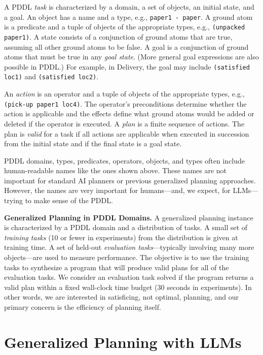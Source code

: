 \documentclass[letterpaper]{article} %
\begin{document}
A PDDL \emph{task} is characterized by a domain, a set of objects, an initial state, and a goal.
An object has a name and a type, e.g., \texttt{paper1 - paper}.
A ground atom is a predicate and a tuple of objects of the appropriate types, e.g., \texttt{(unpacked paper1)}.
A state consists of a conjunction of ground atoms that are true, assuming all other ground atoms to be false.
A goal is a conjunction of ground atoms that must be true in any {\em goal state}.
(More general goal expressions are also possible in PDDL.)
For example, in Delivery, the goal may include \texttt{(satisfied loc1)} and \texttt{(satisfied loc2)}.

An \emph{action} is an operator and a tuple of objects of the appropriate types, e.g., \texttt{(pick-up paper1 loc4)}.
The operator's preconditions determine whether the action is applicable and the effects define what ground atoms would be added or deleted if the operator is executed.
A \emph{plan} is a finite sequence of actions.
The plan is \emph{valid} for a task if all actions are applicable when executed in succession from the initial state and if the final state is a goal state.

PDDL domains, types, predicates, operators, objects, and types often include human-readable names like the ones shown above.
These names are not important for standard AI planners or previous generalized planning approaches.
However, the names are very important for humans---and, we expect, for LLMs---trying to make sense of the PDDL.

\textbf{Generalized Planning in PDDL Domains.}
A generalized planning instance is characterized by a PDDL domain and a distribution of tasks.
A small set of \emph{training tasks} (10 or fewer in experiments) from the distribution is given at training time.
A set of held-out \emph{evaluation tasks}---typically involving many more objects---are used to measure performance.
The objective is to use the training tasks to synthesize a program that will produce valid plans for all of the evaluation tasks.
We consider an evaluation task solved if the program returns a valid plan within a fixed wall-clock time budget (30 seconds in experiments).
In other words, we are interested in satisficing, not optimal, planning, and our primary concern is the efficiency of planning itself.

\section{Generalized Planning with LLMs}
\end{document}

